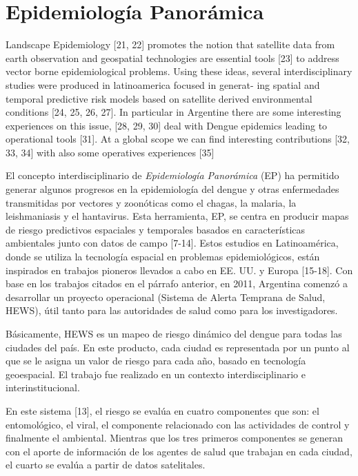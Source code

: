 



\section{Epidemiología Panorámica}

\justifying
Landscape Epidemiology [21, 22] promotes the notion that satellite data
from earth observation and geospatial technologies are essential tools [23] to
address vector borne epidemiological problems. Using these ideas, several
interdisciplinary studies were produced in latinoamerica focused in generat-
ing spatial and temporal predictive risk models based on satellite derived
environmental conditions [24, 25, 26, 27]. In particular in Argentine there
are some interesting experiences on this issue, [28, 29, 30] deal with Dengue
epidemics leading to operational tools [31]. At a global scope we can find
interesting contributions [32, 33, 34] with also some operatives experiences
[35]


El concepto interdisciplinario de \textit{Epidemiología Panorámica} (EP)
ha permitido generar algunos progresos en la epidemiología del dengue y otras
enfermedades transmitidas por vectores y zoonóticas como el chagas, la
malaria, la leishmaniasis y el hantavirus. Esta herramienta, EP, se centra en
producir mapas de riesgo predictivos espaciales y temporales basados en
características ambientales junto con datos de campo [7-14].
Estos estudios en Latinoamérica, donde se utiliza la tecnología espacial en
problemas epidemiológicos, están inspirados en trabajos pioneros llevados a cabo
en EE. UU. y Europa [15-18].
Con base en los trabajos citados en el párrafo anterior, en 2011, Argentina
comenzó a desarrollar un proyecto operacional
(Sistema de Alerta Temprana de Salud, HEWS), útil tanto para las autoridades de
salud como para los investigadores.

Básicamente, HEWS es un mapeo de riesgo
dinámico del dengue para todas las ciudades del país. En este producto, cada
ciudad es representada por un punto al que se le asigna un valor de riesgo para
cada año, basado en tecnología geoespacial. El trabajo fue realizado en un
contexto interdisciplinario e interinstitucional.

En este sistema [13], el riesgo se evalúa en cuatro componentes que son: el
entomológico, el viral, el componente relacionado con las actividades de
control y finalmente el ambiental. Mientras que los tres primeros componentes
se generan con el aporte de información de los agentes de salud que trabajan en cada
ciudad, el cuarto se evalúa a partir de datos satelitales.

